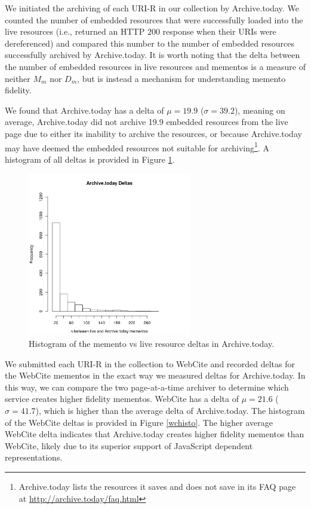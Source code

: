 We initiated the archiving of each URI-R in our collection by Archive.today. We counted the number of embedded resources that were successfully loaded into the live resources (i.e., returned an HTTP 200 response when their URIs were dereferenced) and compared this number to the number of embedded resources successfully archived by Archive.today. It is worth noting that the delta between the number of embedded resources in live resources and mementos is a measure of neither $M_m$ nor $D_m$, but is instead a mechanism for understanding memento fidelity. 

We found that Archive.today has a delta of $\mu=19.9$ ($\sigma=39.2$), meaning on average, Archive.today did not archive 19.9 embedded resources from the live page due to either its inability to archive the resources, or because Archive.today may have deemed the embedded resources not suitable for archiving\footnote{Archive.today lists the resources it saves and does not save in its FAQ page at \url{http://archive.today/faq.html}}. A histogram of all deltas is provided in Figure \ref{athisto}.

\begin{figure}[h!]
\includegraphics[width=270px]{./imgs/atHisto.png}
\caption{Histogram of the memento vs live resource deltas in Archive.today.}
\label{athisto}
\end{figure}

We submitted each URI-R in the collection to WebCite and recorded deltas for the WebCite mementos in the exact way we measured deltas for Archive.today. In this way, we can compare the two page-at-a-time archiver to determine which service creates higher fidelity mementos. WebCite has a delta of $\mu=21.6$ ($\sigma=41.7$), which is higher than the average delta of Archive.today. The histogram of the WebCite deltas is provided in Figure \ref{wchisto}. The higher average WebCite delta indicates that Archive.today creates higher fidelity mementos than WebCite, likely due to its superior support of JavaScript dependent representations.

